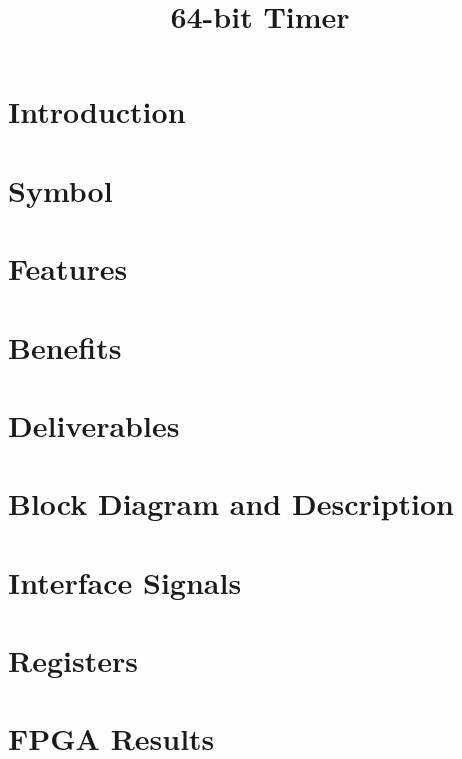 \documentclass{../../submodules/TEX/document/ug/ug}
\title{64-bit Timer}
\begin{document}
\maketitle
\cleardoublepage
\tableofcontents
\listoftables
\listoffigures
\cleardoublepage

\section{Introduction}


\section{Symbol}


\section{\textcolor[rgb]{0,0,0}{Features}}

\clearpage

\section{\textcolor[rgb]{0,0,0}{Benefits}}


\section{\textcolor[rgb]{0,0,0}{Deliverables}}

\clearpage

\section{\textcolor[rgb]{0,0,0}{Block Diagram and Description}}

\clearpage

%

\section{Interface Signals}


\section{Registers}


\section{\textcolor[rgb]{0,0,0}{FPGA Results}}


%
%
\end{document}

